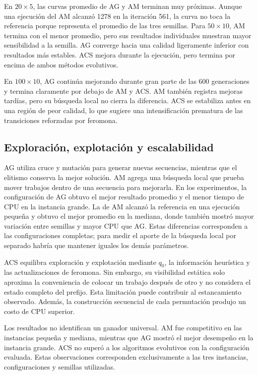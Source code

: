 \documentclass[journal]{IEEEtran}
\begin{document}
En $20\times5$, las curvas promedio de AG y AM terminan muy próximas. Aunque una ejecución del AM alcanzó 1278 en la iteración 561, la curva no toca la referencia porque representa el promedio de las tres semillas. Para $50\times10$, AM termina con el menor promedio, pero sus resultados individuales muestran mayor sensibilidad a la semilla. AG converge hacia una calidad ligeramente inferior con resultados más estables. ACS mejora durante la ejecución, pero termina por encima de ambos métodos evolutivos.

En $100\times10$, AG continúa mejorando durante gran parte de las 600 generaciones y termina claramente por debajo de AM y ACS. AM también registra mejoras tardías, pero su búsqueda local no cierra la diferencia. ACS se estabiliza antes en una región de peor calidad, lo que sugiere una intensificación prematura de las transiciones reforzadas por feromona.

\subsection{Exploración, explotación y escalabilidad}

AG utiliza cruce y mutación para generar nuevas secuencias, mientras que el elitismo conserva la mejor solución. AM agrega una búsqueda local que prueba mover trabajos dentro de una secuencia para mejorarla. En los experimentos, la configuración de AG obtuvo el mejor resultado promedio y el menor tiempo de CPU en la instancia grande. La de AM alcanzó la referencia en una ejecución pequeña y obtuvo el mejor promedio en la mediana, donde también mostró mayor variación entre semillas y mayor CPU que AG. Estas diferencias corresponden a las configuraciones completas; para medir el aporte de la búsqueda local por separado habría que mantener iguales los demás parámetros.

ACS equilibra exploración y explotación mediante $q_0$, la información heurística y las actualizaciones de feromona. Sin embargo, su visibilidad estática solo aproxima la conveniencia de colocar un trabajo después de otro y no considera el estado completo del prefijo. Esta limitación puede contribuir al estancamiento observado. Además, la construcción secuencial de cada permutación produjo un costo de CPU superior.

Los resultados no identifican un ganador universal. AM fue competitivo en las instancias pequeña y mediana, mientras que AG mostró el mejor desempeño en la instancia grande. ACS no superó a los algoritmos evolutivos con la configuración evaluada. Estas observaciones corresponden exclusivamente a las tres instancias, configuraciones y semillas utilizadas.
\end{document}
